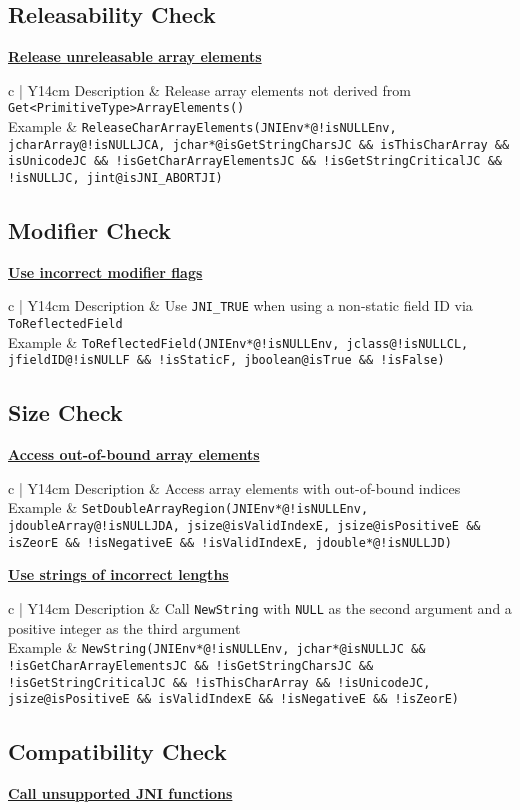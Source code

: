 \documentclass[10pt]{article}
\newcommand{\tc}[1]{\noindent\textbf{\underline{#1}}}
\newcommand{\mytable}[1]{{\renewcommand{\arraystretch}{2.0}
      \begin{tabular}{ c | Y{14cm}} #1
    \end{tabular}}\hfill}
\newcommand{\tctable}[4]{\mytable{#1 & #2 \\\hline #3 & \texttt{#4} \\}}
\begin{document}
\subsection{Releasability Check}
\tc{Release unreleasable array elements}

\tctable
{Description}
{Release array elements not derived from {\tt Get<PrimitiveType>ArrayElements()}}
{Example}
{ReleaseCharArrayElements(JNIEnv*@!isNULLEnv, jcharArray@!isNULLJCA, jchar*@isGetStringCharsJC \&\& isThisCharArray \&\& isUnicodeJC \&\& !isGetCharArrayElementsJC \&\& !isGetStringCriticalJC \&\& !isNULLJC, jint@isJNI\_ABORTJI)}


\subsection{Modifier Check}
\tc{Use incorrect modifier flags}

\tctable
{Description}
{Use {\tt JNI\_TRUE} when using a non-static field ID via {\tt ToReflectedField}}
{Example}
{ToReflectedField(JNIEnv*@!isNULLEnv, jclass@!isNULLCL, jfieldID@!isNULLF \&\& !isStaticF, jboolean@isTrue \&\& !isFalse)}


\subsection{Size Check}
\tc{Access out-of-bound array elements}

\tctable
{Description}
{Access array elements with out-of-bound indices}
{Example}
{SetDoubleArrayRegion(JNIEnv*@!isNULLEnv, jdoubleArray@!isNULLJDA, jsize@isValidIndexE, jsize@isPositiveE \&\& isZeorE \&\& !isNegativeE \&\& !isValidIndexE, jdouble*@!isNULLJD)}

\vspace{3mm}
\tc{Use strings of incorrect lengths}

\tctable
{Description}
{Call {\tt NewString} with {\tt NULL} as the second argument and a positive integer as the third argument}
{Example}
{NewString(JNIEnv*@!isNULLEnv, jchar*@isNULLJC \&\& !isGetCharArrayElementsJC \&\& !isGetStringCharsJC \&\& !isGetStringCriticalJC \&\& !isThisCharArray \&\& !isUnicodeJC, jsize@isPositiveE \&\& isValidIndexE \&\& !isNegativeE \&\& !isZeorE)}

\newpage
\subsection{Compatibility Check}
\tc{Call unsupported JNI functions}
\end{document}
